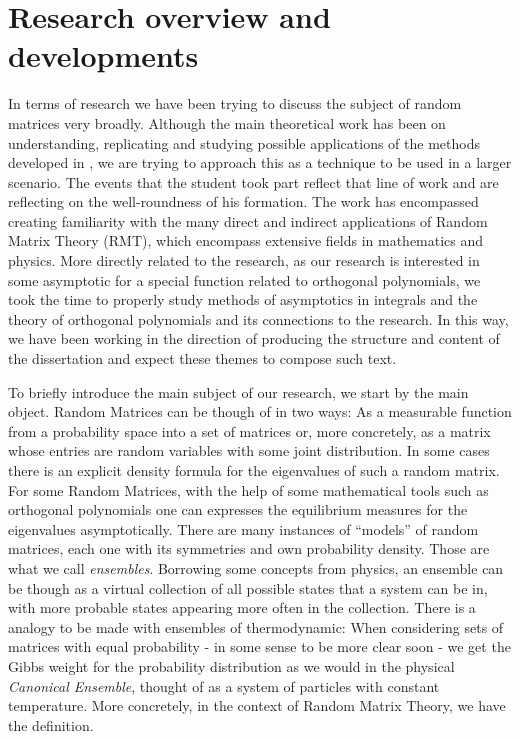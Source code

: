 \documentclass[12pt]{report}
\begin{document}
\section{Research overview and developments}
\label{Pesquisa}

In terms of research we have been trying to discuss the subject of random matrices very broadly. Although the main theoretical work has been on understanding, replicating and studying possible applications of the methods developed in \cite{Byun_2023}, we are trying to approach this as a technique to be used in a larger scenario. The events that the student took part reflect that line of work and are reflecting on the well-roundness of his formation. The work has encompassed creating familiarity with the many direct and indirect applications of Random Matrix Theory (RMT), which encompass extensive fields in mathematics and physics. More directly related to the research, as our research is interested in some asymptotic for a special function related to orthogonal polynomials, we took the time to properly study methods of asymptotics in integrals and the theory of orthogonal polynomials and its connections to the research.  In this way, we have been working in the direction of producing the structure and content of the dissertation and expect these themes to compose such text.

To briefly introduce the main subject of our research, we start by the main object. Random Matrices can be though of in two ways: As a measurable function from a probability space into a set of matrices or, more concretely, as a matrix whose entries are random variables with some joint distribution. In some cases there is an explicit density formula for the eigenvalues of such a random matrix. For some Random Matrices, with the help of some mathematical tools such as orthogonal polynomials one can expresses the equilibrium measures for the eigenvalues asymptotically.  There are many instances of \enquote{models} of random matrices, each one with its symmetries and own probability density. Those are what we call \textit{ensembles}. Borrowing some concepts from physics, an ensemble can be though as a virtual collection of all possible states that a system can be in, with more probable states appearing more often in the collection. There is a analogy to be made with ensembles of thermodynamic: When considering sets of matrices with equal probability - in some sense to be more clear soon - we get the Gibbs weight for the probability distribution as we would in the physical \textit{Canonical Ensemble}, thought of as a system of particles with constant temperature. More concretely, in the context of Random Matrix Theory, we have the definition.
\end{document}

